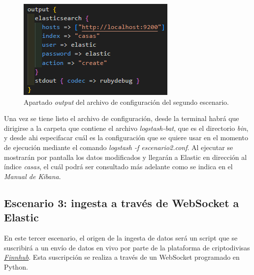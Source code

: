 \begin{figure}
    \centering
    \includegraphics[width=1\linewidth]{img/output2.png}
    \caption{Apartado \textit{output} del archivo de configuración del segundo escenario.}
    \label{fig:output2}
\end{figure}

Una vez se tiene listo el archivo de configuración, desde la terminal habrá que dirigirse a la carpeta que contiene el archivo \textit{logstash-bat}, que es el directorio \textit{bin}, y desde ahi especifacar cuál es la configuración que se quiere usar en el momento de ejecución mediante el comando \textit{logstash -f escenario2.conf}. Al ejecutar se mostrarán por pantalla los datos modificados y llegarán a Elastic en dirección al índice \textit{casas}, el cuál podrá ser consultado más adelante como se indica en el \textit{Manual de Kibana}.

\paragraph{}

\subsection{Escenario 3: ingesta a través de WebSocket a Elastic}
En este tercer escenario, el origen de la ingesta de datos será un script que se suscribirá a un envío de datos en vivo por parte de la plataforma de criptodivisas \href{https://finnhub.io/docs/api/websocket-trades}{\textit{Finnhub}}. Esta suscripción se realiza a través de un WebSocket programado en Python.

